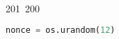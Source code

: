 201~200~\documentclass{article}
\begin{document}
\begin{lstlisting}[language=Python, caption=Encrypting a Message with ChaCha20-Poly1305]
	                                                                                                                                                                                                                                                                                                	                                                                                                                                        	    	                                                                                                	                                                                                                                                                                                                                                                                                                                                	                                                                        	                                                                        	                                                                                                                                        	                                                                                                                                                                                                                        	                                                                                                                            	                                                                	                                                                                                                                nonce = os.urandom(12)

\end{lstlisting}
\end{document}
